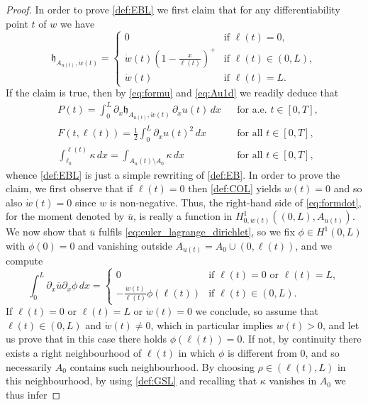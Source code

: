 \documentclass[a4paper,11pt,reqno]{amsart}
\numberwithin{equation}{section}
\theoremstyle{definition}
\theoremstyle{remark}
\begin{document}
\begin{proof}
        In order to prove \ref{def:EBL} we first claim that for any differentiability point $t$ of $w$ we have
        \begin{equation}\label{eq:formdot}
            \mathfrak{h}_{A_{u(t)},\dot w(t)}=\begin{cases}
                0&\text{if }\ell(t)=0,\\
                \dot w(t)\left(1-\frac{x}{\ell(t)}\right)^+ &\text{if }\ell(t)\in(0,L),\\
                \dot w(t) &\text{if }\ell(t)=L.
            \end{cases}
        \end{equation}
        If the claim is true, then by \eqref{eq:formu} and \eqref{eq:Au1d} we readily deduce that
        \begin{subequations}\label{eq:rewriting}
        \begin{align}
            &P(t) =\int_0^L \partial_x \mathfrak{h}_{A_{u(t)},\dot w(t)}\,\partial_x u(t)\, dx &&\text{for a.e. }t\in [0,T],\\
            &F(t,\ell(t))=\frac 12 \int_0^L \partial_x u(t)^2\, dx &&\text{for all }t\in [0,T],\\
            &\int_{\ell_0}^{\ell(t)}\kappa \,dx=\int_{A_u(t)\setminus A_0}\kappa \,dx &&\text{for all }t\in [0,T],
        \end{align}
        \end{subequations}
        whence \ref{def:EBL} is just a simple rewriting of \ref{def:EB}.
        In order to prove the claim, we first observe that if $\ell(t)=0$ then \ref{def:COL} yields $w(t)=0$ and so also $\dot w (t)=0$ since $w$ is non-negative.
        Thus, the right-hand side of \eqref{eq:formdot}, for the moment denoted by $\overline u$, is really a function in $H^1_{0,\dot w(t)}((0,L), A_{u(t)})$.
        We now show that $\overline u$ fulfils \eqref{eq:euler_lagrange_dirichlet}, so we fix $\phi\in H^1(0,L)$ with $\phi(0)=0$ and vanishing outside $ A_{u(t)}=A_0\cup (0,\ell(t))$, and we compute
        \begin{equation}
            \int_0^L \partial_x \overline u \partial_x \phi\, dx=\begin{cases}
                0 &\text{if }\ell(t)=0\text{ or }\ell(t)=L,\\
                -\frac{\dot w(t)}{\ell(t)}\phi(\ell(t))  &\text{if }\ell(t)\in(0,L).
            \end{cases}
        \end{equation}
        If $\ell(t)=0$ or $\ell(t)=L$ or $\dot w(t)=0$ we conclude, so assume that $\ell(t)\in (0,L)$ and $\dot w(t)\neq 0$, which in particular implies $w(t)>0$, and let us prove that in this case there holds $\phi(\ell(t))=0$. If not, by continuity there exists a right neighbourhood of $\ell(t)$ in which $\phi$ is different from $0$, and so necessarily $A_0$ contains such neighbourhood. By choosing $\rho \in(\ell(t),L)$ in this neighbourhood, by using \ref{def:GSL} and recalling that $\kappa $ vanishes in $A_0$ we thus infer

\end{proof}
\end{document}
